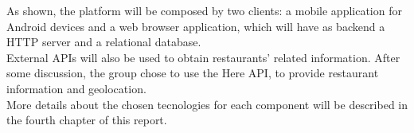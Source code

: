 As shown, the platform will be composed by two clients: a mobile application for Android devices and a web browser
application, which will have as backend a HTTP server and a relational database.\\

External APIs will also be used to obtain restaurants' related information. After some discussion, the group chose
to use the Here API, to provide restaurant information and geolocation.\\

More details about the chosen tecnologies for each component will be described in the fourth chapter of this report.\\